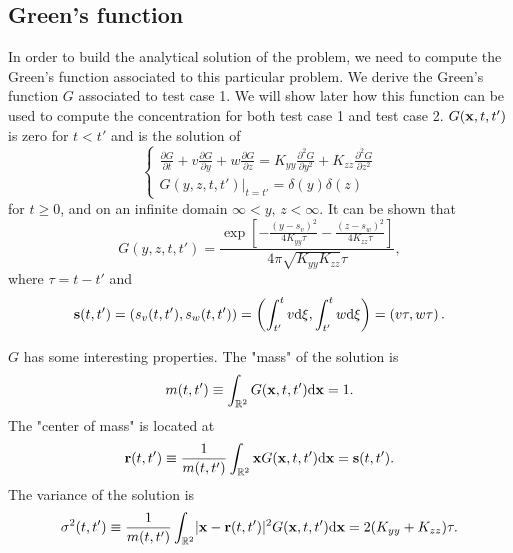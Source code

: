\subsection{Green's function}
In order to build the analytical solution of the problem, we need to compute the Green's function associated to this particular problem. We derive the Green's function $G$ associated to test case 1. We will show later how this function can be used to compute the concentration for both test case 1 and test case 2. $\G$ is zero for $t<t'$ and is the solution of
\begin{equation} \label{eq:testcase_green}
	\begin{cases}
		\frac{\partial G}{\partial t} + v \frac{\partial G}{\partial y} + w\frac{\partial G}{\partial z} = K_{yy}\frac{\partial^2 G}{\partial y^2} + K_{zz}\frac{\partial^2 G}{\partial z^2}\\[.1cm]
		\left. G(y,z,t,t') \right \rvert_{t=t'} = \delta(y)\delta(z) 
	\end{cases}
\end{equation}
for $t \ge 0$, and on an infinite domain $\infty < y,\, z < \infty$. It can be shown that
\begin{equation} 
	G(y,z,t,t') = \frac{\exp\left[-\frac{(y-s_v)^2}{4K_{yy}\tau} -\frac{(z-s_w)^2}{4K_{zz}\tau} \right]}{4\pi\sqrt{K_{yy}K_{zz}}\tau},
\end{equation}
where $\tau = t-t'$ and 
\begin{equation}
	\b s(t,t') = (s_v(t,t'), s_w(t,t')) = \left(\int_{t'}^{t}v \rm d \xi, \int_{t'}^{t}w \rm d \xi \right) = \left(v\tau, w\tau\right).
\end{equation}

$G$ has some interesting properties. The "mass" of the solution is
\begin{equation} \label{eq:testcase:propmass}
	m(t,t') \equiv \int_{\R[2]} \G \rm d \b x = 1.
\end{equation}
The "center of mass" is located at
\begin{equation} \label{eq:testcase:propcenter}
	\b r(t,t') \equiv \frac{1}{m(t,t')} \int_{\R[2]} \b x \G \rm d \b x  = \b s(t,t').
\end{equation}
The variance of the solution is
\begin{equation} \label{eq:testcase:propvar}
	\sigma^2(t,t') \equiv \frac{1}{m(t,t')} \int_{\R[2]} \lvert \b x - \b r(t,t') \rvert^2 \G \rm d \b x = 2 (K_{yy}+K_{zz}) \tau.
\end{equation}

